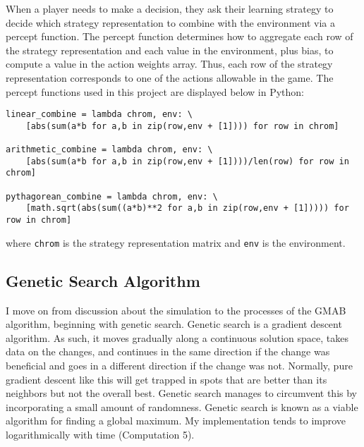 \documentclass[11pt]{article}
\begin{document}
When a player needs to make a decision, they ask their learning strategy to decide which strategy representation to combine with the environment via a percept function. The percept function determines how to aggregate each row of the strategy representation and each value in the environment, plus bias, to compute a value in the action weights array. Thus, each row of the strategy representation corresponds to one of the actions allowable in the game. The percept functions used in this project are displayed below in Python:
\begin{verbatim}
linear_combine = lambda chrom, env: \
    [abs(sum(a*b for a,b in zip(row,env + [1]))) for row in chrom]

arithmetic_combine = lambda chrom, env: \
    [abs(sum(a*b for a,b in zip(row,env + [1])))/len(row) for row in chrom]	

pythagorean_combine = lambda chrom, env: \
    [math.sqrt(abs(sum((a*b)**2 for a,b in zip(row,env + [1])))) for row in chrom]	
\end{verbatim}
where \texttt{chrom} is the strategy representation matrix and \texttt{env} is the environment.


\subsection{Genetic Search Algorithm}
I move on from discussion about the simulation to the processes of the GMAB algorithm, beginning with genetic search. Genetic search is a gradient descent algorithm. As such, it moves gradually along a continuous solution space, takes data on the changes, and continues in the same direction if the change was beneficial and goes in a different direction if the change was not. Normally, pure gradient descent like this will get trapped in spots that are better than its neighbors but not the overall best. Genetic search manages to circumvent this by incorporating a small amount of randomness. Genetic search is known as a viable algorithm for finding a global maximum. My implementation tends to improve logarithmically with time (Computation 5). 
\end{document}

